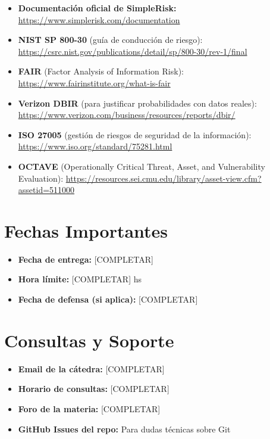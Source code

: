 \documentclass[11pt,a4paper]{article}
\begin{document}
\begin{itemize}
    \item \textbf{Documentación oficial de SimpleRisk:} \url{https://www.simplerisk.com/documentation}
    
    \item \textbf{NIST SP 800-30} (guía de conducción de riesgo): \url{https://csrc.nist.gov/publications/detail/sp/800-30/rev-1/final}
    
    \item \textbf{FAIR} (Factor Analysis of Information Risk): \url{https://www.fairinstitute.org/what-is-fair}
    
    \item \textbf{Verizon DBIR} (para justificar probabilidades con datos reales): \url{https://www.verizon.com/business/resources/reports/dbir/}
    
    \item \textbf{ISO 27005} (gestión de riesgos de seguridad de la información): \url{https://www.iso.org/standard/75281.html}
    
    \item \textbf{OCTAVE} (Operationally Critical Threat, Asset, and Vulnerability Evaluation): \url{https://resources.sei.cmu.edu/library/asset-view.cfm?assetid=511000}
\end{itemize}

\section{Fechas Importantes}

\begin{infobox}
\begin{itemize}
    \item \textbf{Fecha de entrega:} [COMPLETAR]
    \item \textbf{Hora límite:} [COMPLETAR] hs
    \item \textbf{Fecha de defensa (si aplica):} [COMPLETAR]
\end{itemize}
\end{infobox}

\section{Consultas y Soporte}

\begin{itemize}
    \item \textbf{Email de la cátedra:} [COMPLETAR]
    \item \textbf{Horario de consultas:} [COMPLETAR]
    \item \textbf{Foro de la materia:} [COMPLETAR]
    \item \textbf{GitHub Issues del repo:} Para dudas técnicas sobre Git
\end{itemize}
\end{document}
